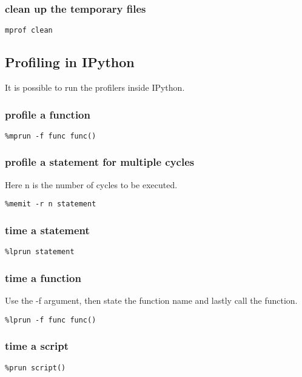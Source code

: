 \subsubsection{clean up the temporary files}
\begin{lstlisting}
mprof clean
\end{lstlisting}

\subsection{Profiling in IPython}
It is possible to run the profilers inside IPython.

\subsubsection{profile a function}
\begin{lstlisting}
%mprun -f func func()
\end{lstlisting}

\subsubsection{profile a statement for multiple cycles}
Here n is the number of cycles to be executed.
\begin{lstlisting}
%memit -r n statement
\end{lstlisting}

\subsubsection{time a statement}
\begin{lstlisting}
%lprun statement
\end{lstlisting}

\subsubsection{time a function}
Use the -f argument, then state the function name and lastly call the function.
\begin{lstlisting}
%lprun -f func func()
\end{lstlisting}

\subsubsection{time a script}
\begin{lstlisting}
%prun script()
\end{lstlisting}

